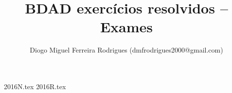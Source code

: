 \documentclass{bdad}
\title{BDAD exercícios resolvidos -- Exames}
\author{Diogo Miguel Ferreira Rodrigues (dmfrodrigues2000@gmail.com)}
\date{}
\begin{document}
\begingroup
\maketitle
    \let\clearpage\relax
	\tableofcontents
\endgroup
{2016N.tex}
{2016R.tex}
\end{document}
